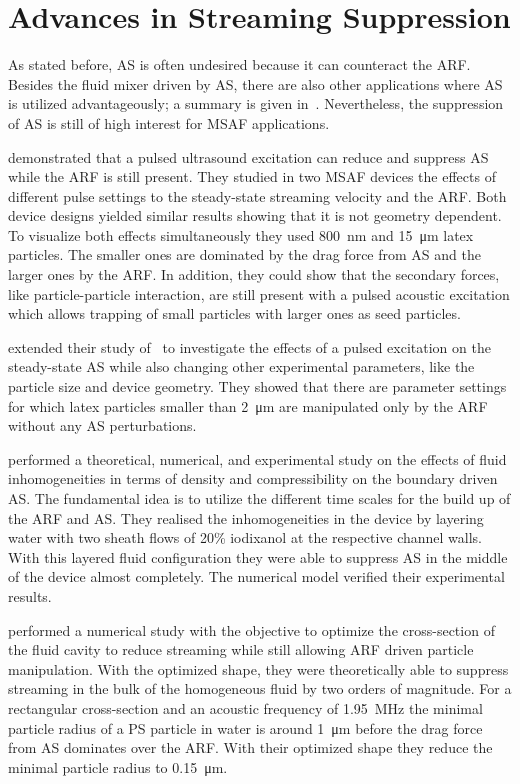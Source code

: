 \section{Advances in Streaming Suppression}

As stated before, AS is often undesired because it can counteract the ARF.  
Besides the fluid mixer driven by AS, there are also other applications where 
AS is utilized advantageously; a summary is given in~\cite{Wiklund2012a}.  
Nevertheless, the suppression of AS is still of high interest for MSAF 
applications.

 demonstrated that a pulsed ultrasound excitation can reduce 
and suppress AS while the ARF is still present. They studied in two MSAF 
devices the effects of different pulse settings to the steady-state streaming 
velocity and the ARF. Both device designs yielded similar results showing that 
it is not geometry dependent. To visualize both effects simultaneously they 
used \SI{800}{\nm} and \SI{15}{\um} latex particles. The smaller ones are 
dominated by the drag force from AS and the larger ones by the ARF. In 
addition, they could show that the secondary forces, like particle-particle 
interaction, are still present with a pulsed acoustic excitation which allows 
trapping of small particles with larger ones as seed particles.

 extended their study of~ to investigate the 
effects of a pulsed excitation on the steady-state AS while also changing other 
experimental parameters, like the particle size and device geometry. They 
showed that there are parameter settings for which latex particles smaller than 
\SI{2}{\um} are manipulated only by the ARF without any AS perturbations.

 performed a theoretical, numerical, and experimental study 
on the effects of fluid inhomogeneities in terms of density and compressibility 
on the boundary driven AS. The fundamental idea is to utilize the different 
time scales for the build up of the ARF and AS. They realised the 
inhomogeneities in the device by layering water with two sheath flows of 20\% 
iodixanol at the respective channel walls. With this layered fluid 
configuration they were able to suppress AS in the middle of the device almost 
completely. The numerical model verified their experimental results.

 performed a numerical study with the objective to optimize the 
cross-section of the fluid cavity to reduce streaming while still allowing ARF 
driven particle manipulation. With the optimized shape, they were theoretically 
able to suppress streaming in the bulk of the homogeneous fluid by two orders 
of magnitude. For a rectangular cross-section and an acoustic frequency of 
\SI{1.95}{\mega\hertz} the minimal particle radius of a PS particle in water is 
around \SI{1}{\um} before the drag force from AS dominates over the ARF. With 
their optimized shape they reduce the minimal particle radius to 
\SI{0.15}{\um}.

